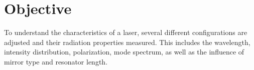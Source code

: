 \section{Objective}

To understand the characteristics of a \HeNe laser, several different configurations are adjusted and their radiation properties measured. This
includes the wavelength, intensity distribution, polarization, mode spectrum, as well as the influence of mirror type and resonator length.
